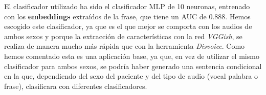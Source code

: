 El clasificador utilizado ha sido el clasificador MLP de 10 neuronas, entrenado con los \textbf{embeddings} extraídos de la frase, que tiene un AUC de 0.888. Hemos escogido este clasificador, ya que es el que mejor se comporta con los audios de ambos sexos y porque la extracción de características con la red \textit{VGGish}, se realiza de manera mucho más rápida que con la herramienta \textit{Disvoice}. Como hemos comentado esta es una aplicación base, ya que, en vez de utilizar el mismo clasificador para ambos sexos, se podría haber generado una sentencia condicional en la que, dependiendo del sexo del paciente y del tipo de audio (vocal palabra o frase), clasificara con diferentes clasificadores.
